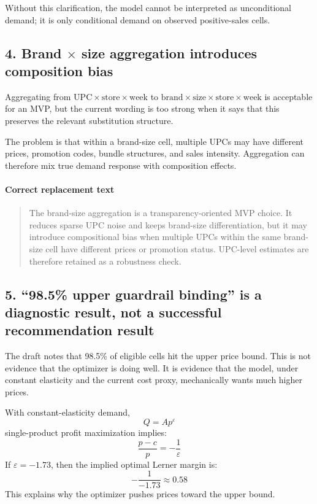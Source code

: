 \documentclass[11pt]{article}
\begin{document}
Without this clarification, the model cannot be interpreted as unconditional demand; it is only conditional demand on observed positive-sales cells.

\subsection*{4. Brand $\times$ size aggregation introduces composition bias}
Aggregating from $\text{UPC} \times \text{store} \times \text{week}$ to $\text{brand} \times \text{size} \times \text{store} \times \text{week}$ is acceptable for an MVP, but the current wording is too strong when it says that this preserves the relevant substitution structure.

The problem is that within a brand-size cell, multiple UPCs may have different prices, promotion codes, bundle structures, and sales intensity. Aggregation can therefore mix true demand response with composition effects.

\paragraph{Correct replacement text}
\begin{quote}
The brand-size aggregation is a transparency-oriented MVP choice. It reduces sparse UPC noise and keeps brand-size differentiation, but it may introduce compositional bias when multiple UPCs within the same brand-size cell have different prices or promotion status. UPC-level estimates are therefore retained as a robustness check.
\end{quote}

\subsection*{5. ``98.5\% upper guardrail binding'' is a diagnostic result, not a successful recommendation result}
The draft notes that 98.5\% of eligible cells hit the upper price bound. This is not evidence that the optimizer is doing well. It is evidence that the model, under constant elasticity and the current cost proxy, mechanically wants much higher prices.

With constant-elasticity demand,
\[
Q = A p^{\varepsilon}
\]
single-product profit maximization implies:
\[
\frac{p-c}{p} = -\frac{1}{\varepsilon}
\]
If $\varepsilon = -1.73$, then the implied optimal Lerner margin is:
\[
-\frac{1}{-1.73} \approx 0.58
\]
This explains why the optimizer pushes prices toward the upper bound.
\end{document}
